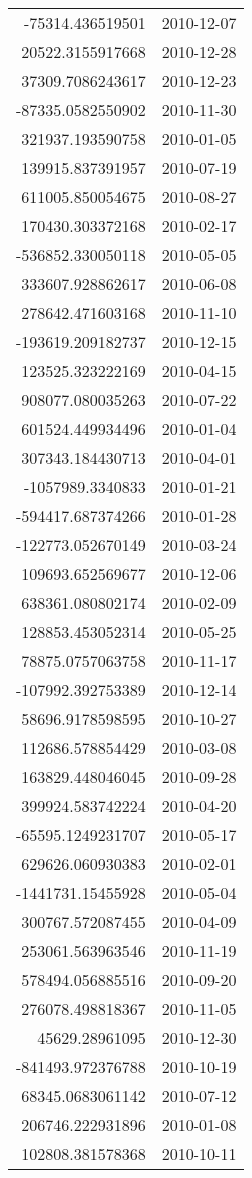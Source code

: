 \begin{tabular}{r | l}
-75314.436519501 & 2010-12-07 \\
20522.3155917668 & 2010-12-28 \\
37309.7086243617 & 2010-12-23 \\
-87335.0582550902 & 2010-11-30 \\
321937.193590758 & 2010-01-05 \\
139915.837391957 & 2010-07-19 \\
611005.850054675 & 2010-08-27 \\
170430.303372168 & 2010-02-17 \\
-536852.330050118 & 2010-05-05 \\
333607.928862617 & 2010-06-08 \\
278642.471603168 & 2010-11-10 \\
-193619.209182737 & 2010-12-15 \\
123525.323222169 & 2010-04-15 \\
908077.080035263 & 2010-07-22 \\
601524.449934496 & 2010-01-04 \\
307343.184430713 & 2010-04-01 \\
-1057989.3340833 & 2010-01-21 \\
-594417.687374266 & 2010-01-28 \\
-122773.052670149 & 2010-03-24 \\
109693.652569677 & 2010-12-06 \\
638361.080802174 & 2010-02-09 \\
128853.453052314 & 2010-05-25 \\
78875.0757063758 & 2010-11-17 \\
-107992.392753389 & 2010-12-14 \\
58696.9178598595 & 2010-10-27 \\
112686.578854429 & 2010-03-08 \\
163829.448046045 & 2010-09-28 \\
399924.583742224 & 2010-04-20 \\
-65595.1249231707 & 2010-05-17 \\
629626.060930383 & 2010-02-01 \\
-1441731.15455928 & 2010-05-04 \\
300767.572087455 & 2010-04-09 \\
253061.563963546 & 2010-11-19 \\
578494.056885516 & 2010-09-20 \\
276078.498818367 & 2010-11-05 \\
45629.28961095 & 2010-12-30 \\
-841493.972376788 & 2010-10-19 \\
68345.0683061142 & 2010-07-12 \\
206746.222931896 & 2010-01-08 \\
102808.381578368 & 2010-10-11 \\
\end{tabular}

